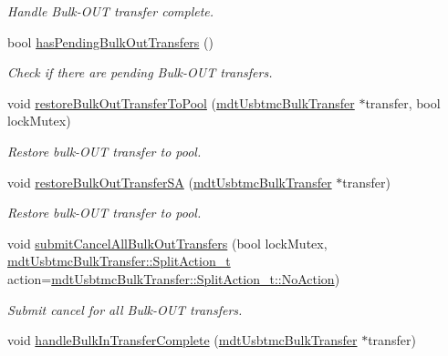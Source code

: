 \begin{DoxyCompactItemize}
\begin{DoxyCompactList}\small\item\em Handle Bulk-\/\-O\-U\-T transfer complete. \end{DoxyCompactList}\item 
bool \hyperlink{classmdt_usbtmc_transfer_handler_a87a2bb97c0c18b1e8ea536a461f005cb}{has\-Pending\-Bulk\-Out\-Transfers} ()
\begin{DoxyCompactList}\small\item\em Check if there are pending Bulk-\/\-O\-U\-T transfers. \end{DoxyCompactList}\item 
void \hyperlink{classmdt_usbtmc_transfer_handler_a8094e085ba7e4f1d980c0b4a62e9310d}{restore\-Bulk\-Out\-Transfer\-To\-Pool} (\hyperlink{classmdt_usbtmc_bulk_transfer}{mdt\-Usbtmc\-Bulk\-Transfer} $\ast$transfer, bool lock\-Mutex)
\begin{DoxyCompactList}\small\item\em Restore bulk-\/\-O\-U\-T transfer to pool. \end{DoxyCompactList}\item 
void \hyperlink{classmdt_usbtmc_transfer_handler_a820945eef7e22749968fc341297330f9}{restore\-Bulk\-Out\-Transfer\-S\-A} (\hyperlink{classmdt_usbtmc_bulk_transfer}{mdt\-Usbtmc\-Bulk\-Transfer} $\ast$transfer)
\begin{DoxyCompactList}\small\item\em Restore bulk-\/\-O\-U\-T transfer to pool. \end{DoxyCompactList}\item 
void \hyperlink{classmdt_usbtmc_transfer_handler_adeceafc13317c0a7c813a162a18b763a}{submit\-Cancel\-All\-Bulk\-Out\-Transfers} (bool lock\-Mutex, \hyperlink{classmdt_usbtmc_bulk_transfer_a81f2309d821053cd7c8f6e32aff93b7c}{mdt\-Usbtmc\-Bulk\-Transfer\-::\-Split\-Action\-\_\-t} action=\hyperlink{classmdt_usbtmc_bulk_transfer_a81f2309d821053cd7c8f6e32aff93b7ca1e601ea653db1c729c9ee5746730fabe}{mdt\-Usbtmc\-Bulk\-Transfer\-::\-Split\-Action\-\_\-t\-::\-No\-Action})
\begin{DoxyCompactList}\small\item\em Submit cancel for all Bulk-\/\-O\-U\-T transfers. \end{DoxyCompactList}\item 
void \hyperlink{classmdt_usbtmc_transfer_handler_a9cc55b0e48365e7deab2981a733c3343}{handle\-Bulk\-In\-Transfer\-Complete} (\hyperlink{classmdt_usbtmc_bulk_transfer}{mdt\-Usbtmc\-Bulk\-Transfer} $\ast$transfer)

\end{DoxyCompactItemize}
